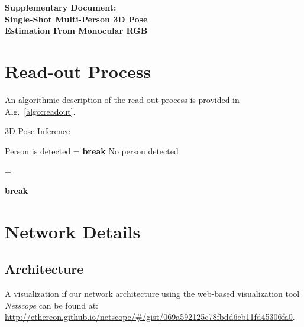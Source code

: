 \begin{center}
\textbf{\large Supplementary Document:\\Single-Shot Multi-Person 3D Pose \\Estimation From Monocular RGB}
\end{center}
\setcounter{equation}{0}
\setcounter{figure}{0}
\setcounter{table}{0}
\setcounter{section}{0}
\section{Read-out Process}
An algorithmic description of the read-out process is provided in Alg.~\ref{algo:readout}.
\begin{algorithm}
\caption{3D Pose Inference} \label{algo:readout}
\begin{algorithmic}[1]
\ForAll{}
\If{ ,  }
\State Person  is detected 
\State 
\State  = 
\EndFor
{}
\For{} 
\State {}
\State \textbf{break}
\EndIf
\EndFor
\EndFor
\Else
\State No person detected
\EndIf
\EndFor

\If{}
\Return 
\Else{}
\If{}
\Return 
\Else{}
\Return 
\EndIf
\EndIf
\EndFunction

\State 
\State \Return 
\EndFunction

\State = 
\EndFor
\EndFunction

\If{ }
\State \Return {} 
\Else
\State {}
\EndIf
\EndFunction

\State{}
\If{ }
\State{}
\State \textbf{break}
\EndIf
\EndFor
\EndFor
\State \Return 
\EndFunction
\end{algorithmic}
\end{algorithm}
\section{Network Details}


\subsection{Architecture}
A visualization if our network architecture using the web-based visualization tool \emph{Netscope} can be found at: \url{http://ethereon.github.io/netscope/#/gist/069a592125c78fbdd6eb11fd45306fa0}.


